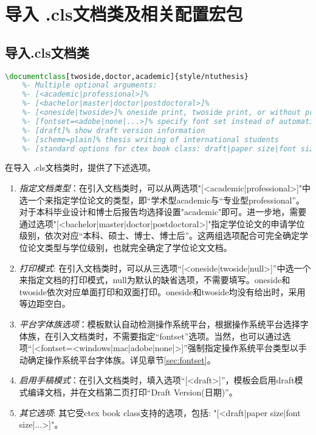 \section{导入 \projectname.cls文档类及相关配置宏包}
\subsection{导入\projectname.cls文档类}
\begin{lstlisting}[language=tex]
    \documentclass[twoside,doctor,academic]{style/ntuthesis}
    %- Multiple optional arguments:
    %- [<academic|professional>]% 
    %- [<bachelor|master|doctor|postdoctoral>]%
    %- [<oneside|twoside>]% oneside print, twoside print, or without print
    %- [fontset=<adobe|none|...>]% specify font set instead of automatic detection
    %- [draft]% show draft version information
    %- [scheme=plain]% thesis writing of international students
    %- [standard options for ctex book class: draft|paper size|font size|...]%
 \end{lstlisting}%
在导入 \projectname.cls文档类时，提供了下述选项。
\begin{enumerate}
    \item \emph{指定文档类型}：在引入文档类时，可以从两选项"[<academic|professional>]"中选一个来指定学位论文的类型，即“学术型academic与“专业型professional”。对于本科毕业设计和博士后报告均选择设置"academic"即可。进一步地，需要通过选项"[<bachelor|master|doctor|postdoctoral>]"指定学位论文的申请学位级别，依次对应“本科、硕士、博士、博士后”。这两组选项配合可完全确定学位论文类型与学位级别，也就完全确定了学位论文文档。
    \item \emph{打印模式}: 在引入文档类时，可以从三选项“[<oneside|twoside|null>]”中选一个来指定文档的打印模式，null为默认的缺省选项，不需要填写。oneside和twoside依次对应单面打印和双面打印。oneside和twoside均没有给出时，采用等边距空白。
    \item \emph{平台字体族选项}：模板默认自动检测操作系统平台，根据操作系统平台选择字体族，在引入文档类时，不需要指定“fontset”选项。当然，也可以通过选项“[<fontset=<windows|mac|adobe|none|>]”强制指定操作系统平台类型以手动确定操作系统平台字体族。详见章节\ref{sec:fontset}。
    \item \emph{启用手稿模式}：在引入文档类时，填入选项“[<draft>]”，模板会启用draft模式编译文档，并在文档第二页打印“Draft Version(日期)”。
    \item \emph{其它选项}: 其它受ctex book class支持的选项，包括: "[<draft|paper size|font size|...>]"。
\end{enumerate}



